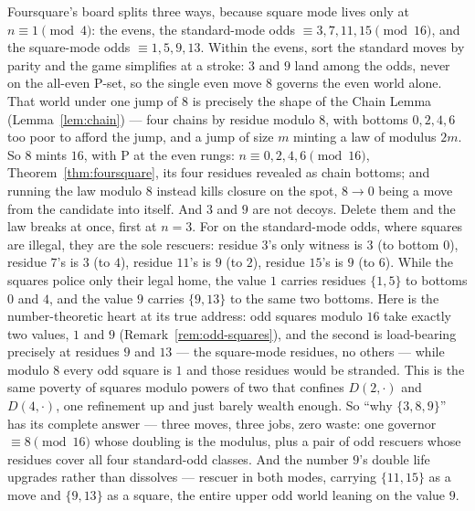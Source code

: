 \begin{remark}\label{rem:mechanism}
Foursquare's board splits three ways, because square mode lives only at
$n \equiv 1 \pmod 4$: the evens, the standard-mode odds
$\equiv 3, 7, 11, 15 \pmod{16}$, and the square-mode odds
$\equiv 1, 5, 9, 13$. Within the evens, sort the standard moves by parity
and the game simplifies at a stroke: $3$ and $9$ land among the odds,
never on the all-even P-set, so the single even move $8$ governs the even
world alone. That world under one jump of $8$ is precisely the shape of
the Chain Lemma (Lemma~\ref{lem:chain}) --- four chains by residue modulo
$8$, with bottoms $0, 2, 4, 6$ too poor to afford the jump, and a jump of
size $m$ minting a law of modulus $2m$. So $8$ mints $16$, with P at
the even rungs: $n \equiv 0, 2, 4, 6 \pmod{16}$,
Theorem~\ref{thm:foursquare}, its four residues revealed as chain bottoms;
and running the law modulo $8$ instead kills closure on the spot,
$8 \to 0$ being a move from the candidate into itself. And $3$ and $9$ are not decoys. Delete them and the law breaks at
once, first at $n = 3$. For on the standard-mode odds, where squares
are illegal, they are the sole rescuers: residue $3$'s only witness is $3$
(to bottom $0$), residue $7$'s is $3$ (to $4$), residue $11$'s is $9$ (to
$2$), residue $15$'s is $9$ (to $6$). While the squares police only
their legal home, the value $1$ carries residues $\{1, 5\}$ to bottoms
$0$ and $4$, and the value $9$ carries $\{9, 13\}$ to the same two
bottoms. Here is the number-theoretic heart at its true address: odd
squares modulo $16$ take exactly two values, $1$ and $9$
(Remark~\ref{rem:odd-squares}), and the second is load-bearing precisely
at residues $9$ and $13$ --- the square-mode residues, no others --- while
modulo $8$ every odd square is $1$ and those residues would be stranded.
This is the same poverty of squares modulo powers of two that confines
$D(2,\cdot)$ and $D(4,\cdot)$, one refinement up and just barely wealth
enough. So ``why $\{3, 8, 9\}$'' has its complete answer --- three moves,
three jobs, zero waste: one governor $\equiv 8 \pmod{16}$ whose doubling
is the modulus, plus a pair of odd rescuers whose residues cover all four
standard-odd classes. And the number $9$'s double life upgrades rather
than dissolves --- rescuer in both modes, carrying $\{11, 15\}$ as a move
and $\{9, 13\}$ as a square, the entire upper odd world leaning on the
value $9$.


\end{remark}
